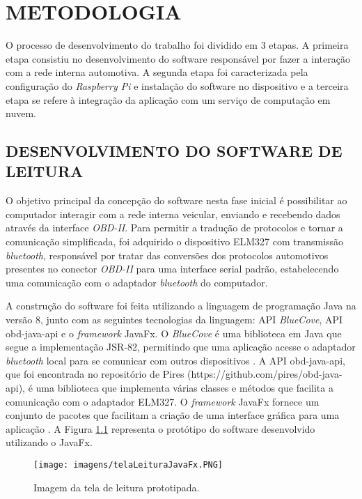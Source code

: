 \chapter{METODOLOGIA}\label{CAP5}

O processo de desenvolvimento do trabalho foi dividido em 3 etapas. A primeira etapa consistiu no desenvolvimento do software responsável por fazer a interação com a rede interna automotiva. A segunda etapa foi caracterizada pela configuração do \textit{Raspberry Pi} e instalação do software no dispositivo e a terceira etapa se refere à integração da aplicação com um serviço de computação em nuvem.

\section{DESENVOLVIMENTO DO SOFTWARE DE LEITURA}
O objetivo principal da concepção do software nesta fase inicial é possibilitar ao computador interagir com a rede interna veicular, enviando e recebendo dados através da interface \textit{OBD-II}. Para permitir a tradução de protocolos e tornar a comunicação simplificada, foi adquirido o dispositivo ELM327 com transmissão \textit{bluetooth}, responsável por tratar das conversões dos protocolos automotivos presentes no conector \textit{OBD-II} para uma interface serial padrão, estabelecendo uma comunicação com o adaptador \textit{bluetooth} do computador.

A construção do software foi feita utilizando a linguagem de programação Java na versão 8, junto com as seguintes tecnologias da linguagem: API \textit{BlueCove}, API obd-java-api e o \textit{framework} JavaFx. O \textit{BlueCove} é uma biblioteca em Java que segue a implementação JSR-82, permitindo que uma aplicação acesse o adaptador \textit{bluetooth} local para se comunicar com outros dispositivos \cite{bluecove}. A API obd-java-api, que foi encontrada no repositório de Pires (https://github.com/pires/obd-java-api), é uma biblioteca que implementa várias classes e métodos que facilita a comunicação com o adaptador ELM327. O \textit{framework} JavaFx fornece um conjunto de pacotes que facilitam a criação de uma interface gráfica para uma aplicação \cite{pawlan}. A Figura \ref{Fig:tela_leitura_javafx} representa o protótipo do software desenvolvido utilizando o JavaFx.

\begin{figure}[!ht]
\centering
\caption{Imagem da tela de leitura prototipada.} 
{\texttt{[image: imagens/telaLeituraJavaFx.PNG]}}\\
 \label{Fig:tela_leitura_javafx}
\end{figure}

